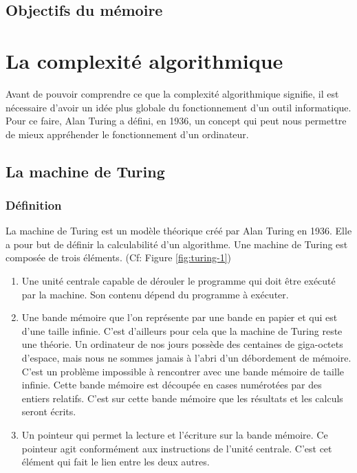 \documentclass[12pt, twoside, openright]{report}
\begin{document}
\section{Objectifs du mémoire}

\chapter{La complexité algorithmique}

Avant de pouvoir comprendre ce que la complexité algorithmique signifie, il est nécessaire d'avoir un idée plus globale du fonctionnement d'un outil informatique. Pour ce faire, Alan Turing a défini, en 1936, un concept qui peut nous permettre de mieux appréhender le fonctionnement d'un ordinateur.

\section{La machine de Turing}

\subsection{Définition}

La machine de Turing est un modèle théorique créé par Alan Turing en 1936. \cite{machineTuring01} Elle a pour but de définir la calculabilité d'un algorithme.   
Une machine de Turing est composée de trois éléments. (Cf: Figure \ref{fig:turing-1})
\begin{enumerate}
    \item Une unité centrale capable de dérouler le programme qui doit être exécuté par la machine. Son contenu dépend du programme à exécuter.
    \item Une bande mémoire que l'on représente par une bande en papier et qui est d'une taille infinie. C'est d'ailleurs pour cela que la machine de Turing reste une théorie. Un ordinateur de nos jours possède des centaines de giga-octets d'espace, mais nous ne sommes jamais à l'abri d'un débordement de mémoire. C'est un problème impossible à rencontrer avec une bande mémoire de taille infinie. Cette bande mémoire est découpée en cases numérotées par des entiers relatifs. C'est sur cette bande mémoire que les résultats et les calculs seront écrits. 
    \item Un pointeur qui permet la lecture et l'écriture sur la bande mémoire. Ce pointeur agit conformément aux instructions de l'unité centrale. C'est cet élément qui fait le lien entre les deux autres.
\end{enumerate}
\end{document}
